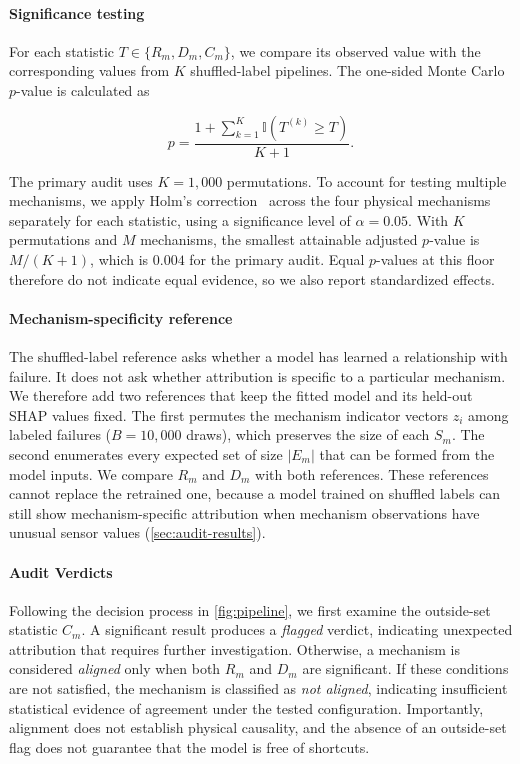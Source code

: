 \documentclass[conference]{IEEEtran}
\begin{document}
\paragraph{Significance testing}
For each statistic $T\in\{R_m,D_m,C_m\}$, we compare its observed value with the corresponding values from $K$ shuffled-label pipelines. The one-sided Monte Carlo $p$-value is calculated as

\begin{equation}
p=\frac{1+\sum_{k=1}^{K}\mathbb{I}(T^{(k)}\geq T)}{K+1}.
\label{eq:pvalue}
\end{equation}

The primary audit uses $K=1{,}000$ permutations. To account for testing multiple mechanisms, we apply Holm's correction~\cite{holm1979simple} across the four physical mechanisms separately for each statistic, using a significance level of $\alpha=0.05$. With $K$ permutations and $M$ mechanisms, the smallest attainable adjusted $p$-value is $M/(K+1)$, which is $0.004$ for the primary audit. Equal $p$-values at this floor therefore do not indicate equal evidence, so we also report standardized effects.

\paragraph{Mechanism-specificity reference}
The shuffled-label reference asks whether a model has learned a relationship with failure. It does not ask whether attribution is specific to a particular mechanism. We therefore add two references that keep the fitted model and its held-out SHAP values fixed. The first permutes the mechanism indicator vectors $z_i$ among labeled failures ($B=10{,}000$ draws), which preserves the size of each $S_m$. The second enumerates every expected set of size $|E_m|$ that can be formed from the model inputs. We compare $R_m$ and $D_m$ with both references. These references cannot replace the retrained one, because a model trained on shuffled labels can still show mechanism-specific attribution when mechanism observations have unusual sensor values (\cref{sec:audit-results}).

\paragraph{Audit Verdicts}
Following the decision process in \cref{fig:pipeline}, we first examine the outside-set statistic $C_m$. A significant result produces a \emph{flagged} verdict, indicating unexpected attribution that requires further investigation. Otherwise, a mechanism is considered \emph{aligned} only when both $R_m$ and $D_m$ are significant. If these conditions are not satisfied, the mechanism is classified as \emph{not aligned}, indicating insufficient statistical evidence of agreement under the tested configuration. Importantly, alignment does not establish physical causality, and the absence of an outside-set flag does not guarantee that the model is free of shortcuts.
\end{document}
